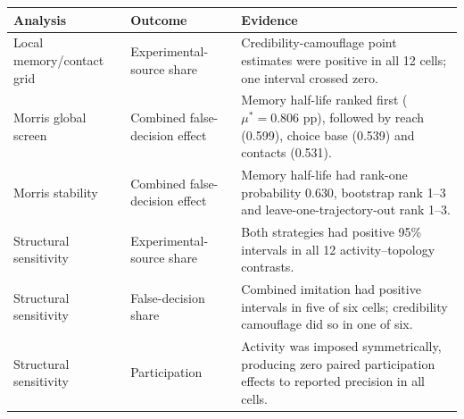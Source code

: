 \begin{tabular}{p{2.6cm}p{2.8cm}p{7.4cm}}
\toprule
Analysis & Outcome & Evidence \\
\midrule
Local memory/contact grid & Experimental-source share & Credibility-camouflage point estimates were positive in all 12 cells; one interval crossed zero. \\
Morris global screen & Combined false-decision effect & Memory half-life ranked first ($\mu^*=0.806$ pp), followed by reach (0.599), choice base (0.539) and contacts (0.531). \\
Morris stability & Combined false-decision effect & Memory half-life had rank-one probability 0.630, bootstrap rank 1--3 and leave-one-trajectory-out rank 1--3. \\
Structural sensitivity & Experimental-source share & Both strategies had positive 95\% intervals in all 12 activity--topology contrasts. \\
Structural sensitivity & False-decision share & Combined imitation had positive intervals in five of six cells; credibility camouflage did so in one of six. \\
Structural sensitivity & Participation & Activity was imposed symmetrically, producing zero paired participation effects to reported precision in all cells. \\
\bottomrule
\end{tabular}
